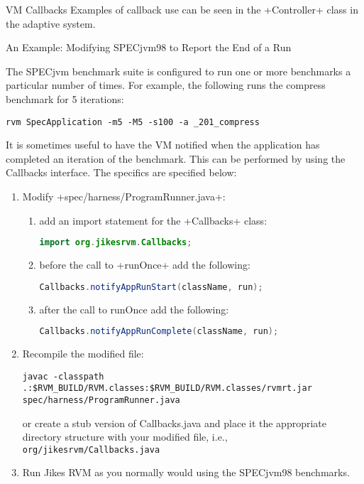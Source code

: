 \begin{section}{VM Callbacks}
Examples of callback use can be seen in the \spverb+Controller+ class in the adaptive system.


\begin{subsection}{An Example: Modifying SPECjvm98 to Report the End of a Run}

The SPECjvm benchmark suite is configured to run one or more benchmarks a particular number of times. For example, the following runs the compress benchmark for 5 iterations:
\begin{lstlisting}
rvm SpecApplication -m5 -M5 -s100 -a _201_compress
\end{lstlisting}

It is sometimes useful to have the VM notified when the application has completed an iteration of the benchmark. This can be performed by using the Callbacks interface. The specifics are specified below:
\begin{enumerate}
  \item Modify \spverb+spec/harness/ProgramRunner.java+:
    \begin{enumerate}
      \item add an import statement for the \spverb+Callbacks+ class:
        \begin{lstlisting}[language=Java]
import org.jikesrvm.Callbacks;
        \end{lstlisting}
      \item before the call to \spverb+runOnce+ add the following:
        \begin{lstlisting}[language=Java]
Callbacks.notifyAppRunStart(className, run);
        \end{lstlisting}
      \item after the call to runOnce add the following:
        \begin{lstlisting}[language=Java]
Callbacks.notifyAppRunComplete(className, run);
        \end{lstlisting}
    \end{enumerate}
  \item Recompile the modified file:
    \begin{lstlisting}
javac -classpath .:$RVM_BUILD/RVM.classes:$RVM_BUILD/RVM.classes/rvmrt.jar spec/harness/ProgramRunner.java
    \end{lstlisting}
    or create a stub version of Callbacks.java and place it the appropriate directory structure with your modified file, i.e., \newline \texttt{org/jikes\-rvm/Call\-backs.java}
  \item  Run Jikes RVM as you normally would using the SPECjvm98 benchmarks.
\end{enumerate}


\end{subsection}
\end{section}
